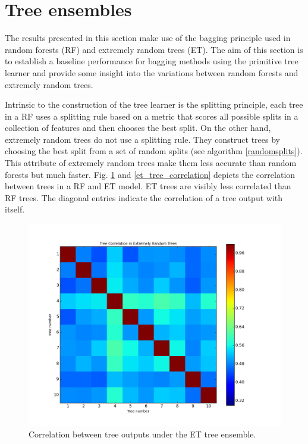 \section{Tree ensembles}

The results presented in this section make use of the bagging principle used in random forests (RF) and extremely random trees (ET). The aim of this section is to establish a baseline performance for bagging methods using the primitive tree learner and provide some insight into the variations between random forests and extremely random trees. 

Intrinsic to the construction of the tree learner is the splitting principle, each tree in a RF uses a splitting rule based on a metric that scores all possible splits in a collection of features and then chooses the best split. On the other hand, extremely random trees do not use a splitting rule. They construct trees by choosing the best split from a set of random splits (see algorithm \ref{randomsplits}). This attribute of extremely random trees make them less accurate than random forests but much faster. Fig. \ref{tree_correlation} and \ref{et_tree_correlation} depicts the correlation between trees in a RF and ET model. ET trees are visibly less correlated than RF trees. The diagonal entries indicate the correlation of a tree output with itself. 

\begin{figure}[h]
\centering
\includegraphics[scale=0.5]{images/ET_tree_correlation.png}
\caption{Correlation between tree outputs under the ET tree ensemble.}
\label{tree_correlation}
\end{figure}

